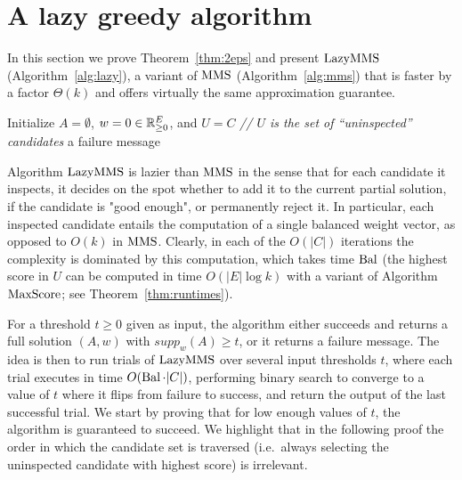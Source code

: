 \section{A lazy greedy algorithm}\label{s:lazymms}

In this section we prove Theorem~\ref{thm:2eps} and present $\lazy$ (Algorithm~\ref{alg:lazy}), a variant of $\operatorname{MMS}$ (Algorithm~\ref{alg:mms}) that is faster by a factor $\Theta(k)$ and offers virtually the same approximation guarantee.

\begin{algorithm}[htb]\label{alg:lazy}
\SetAlgoLined
{}
Initialize $A=\emptyset$, $w=0\in\mathbb{R}_{\geq 0}^E$, and $U=C$ \quad \emph{// $U$ is the set of ``uninspected'' candidates} \;
\Return a failure message\;
\caption{$\lazy$}
\end{algorithm}

Algorithm $\lazy$ is lazier than $\operatorname{MMS}$ in the sense that for each candidate it inspects, it decides on the spot whether to add it to the current partial solution, if the candidate is "good enough", or permanently reject it. In particular, each inspected candidate entails the computation of a single balanced weight vector, as opposed to $O(k)$ in $\operatorname{MMS}$. Clearly, in each of the $O(|C|)$ iterations the complexity is dominated by this computation, which takes time $\operatorname{Bal}$ (the highest score in $U$ can be computed in time $O(|E|\log k)$ with a variant of Algorithm $\operatorname{MaxScore}$; see Theorem~\ref{thm:runtimes}). 

For a threshold $t\geq 0$ given as input, the algorithm either succeeds and returns a full solution $(A,w)$ with $supp_w(A)\geq t$, or it returns a failure message. 
The idea is then to run trials of $\lazy$ over several input thresholds $t$, where each trial executes in time $O(\operatorname{Bal}\cdot |C|)$, performing binary search to converge to a value of $t$ where it flips from failure to success, and return the output of the last successful trial. 
We start by proving that for low enough values of $t$, the algorithm is guaranteed to succeed. 
We highlight that in the following proof the order in which the candidate set is traversed (i.e.~always selecting the uninspected candidate with highest score) is irrelevant. 

